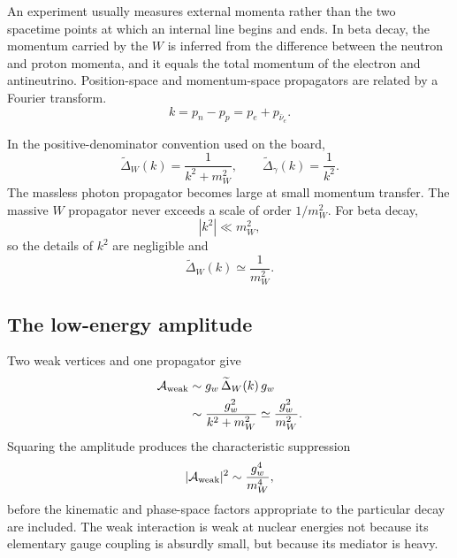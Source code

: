 An experiment usually measures external momenta rather than the two
spacetime points at which an internal line begins and ends. In beta decay, the
momentum carried by the \(W\) is inferred from the difference between the
neutron and proton momenta, and it equals the total momentum of the electron
and antineutrino. Position-space and momentum-space propagators are related by
a Fourier transform.
\begin{equation}
  k=p_n-p_p=p_e+p_{\bar\nu_e}.
\end{equation}

In the positive-denominator convention used on the board,
\begin{equation}
  \widetilde{\Delta}_W(k)=\frac1{k^2+m_W^2},
  \qquad
  \widetilde{\Delta}_\gamma(k)=\frac1{k^2}.
\end{equation}
The massless photon propagator becomes large at small momentum transfer. The
massive \(W\) propagator never exceeds a scale of order \(1/m_W^2\). For beta
decay,
\begin{equation}
  |k^2|\ll m_W^2,
\end{equation}
so the details of \(k^2\) are negligible and
\begin{equation}
  \widetilde{\Delta}_W(k)\simeq\frac1{m_W^2}.
\end{equation}

\begin{classroomqa}
\end{classroomqa}

\subsection{The low-energy amplitude}

Two weak vertices and one propagator give
\begin{align}
  \mathcal A_{\rm weak}
  &\sim g_w\,\widetilde{\Delta}_W(k)\,g_w\\
  &\sim\frac{g_w^2}{k^2+m_W^2}
  \simeq\frac{g_w^2}{m_W^2}.
\end{align}
Squaring the amplitude produces the characteristic suppression
\begin{equation}
  |\mathcal A_{\rm weak}|^2
  \sim\frac{g_w^4}{m_W^4},
\end{equation}
before the kinematic and phase-space factors appropriate to the particular
decay are included. The weak interaction is weak at nuclear energies not
because its elementary gauge coupling is absurdly small, but because its
mediator is heavy.

